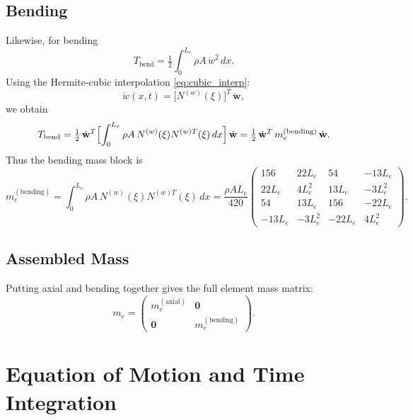 \documentclass{article}
\begin{document}
	\subsection{Bending}
	Likewise, for bending
	\begin{equation}
		T_{\mathrm{bend}}
		= \tfrac12\int_0^{L_e}\rho A\,\dot w^2\,dx.
	\end{equation}
	Using the Hermite‐cubic interpolation \eqref{eq:cubic_interp}:
	\begin{equation}
		\dot w(x,t)
		= \bigl[N^{(w)}(\xi)\bigr]^T\,\dot{\mathbf{w}},
	\end{equation}
	we obtain
	\begin{equation}
		T_{\mathrm{bend}}
		= \tfrac12\,\dot{\mathbf{w}}^T
		\Bigl[\int_0^{L_e}\rho A\,N^{(w)}(\xi)N^{(w)T}(\xi)\,dx\Bigr]
		\,\dot{\mathbf{w}}
		= \tfrac12\,\dot{\mathbf{w}}^T\,m_e^{(\mathrm{bending})}\,\dot{\mathbf{w}}.
	\end{equation}
	Thus the bending mass block is
	\begin{equation}\label{eq:me_bending}
		m_e^{(\mathrm{bending})}
		= \int_0^{L_e}\rho A\,N^{(w)}(\xi)N^{(w)T}(\xi)\,dx
		= \frac{\rho A L_e}{420}
		\begin{pmatrix}
			156 & 22L_e & 54 & -13L_e\\
			22L_e & 4L_e^2 & 13L_e & -3L_e^2\\
			54 & 13L_e & 156 & -22L_e\\
			-13L_e & -3L_e^2 & -22L_e & 4L_e^2
		\end{pmatrix}.
	\end{equation}
	
	\subsection{Assembled Mass}
	Putting axial and bending together gives the full element mass matrix:
	\begin{equation}\label{eq:me_assembled}
		m_e
		= \begin{pmatrix}
			m_e^{(\mathrm{axial})} & \mathbf{0}\\
			\mathbf{0}            & m_e^{(\mathrm{bending})}
		\end{pmatrix}.
	\end{equation}
	
	\section*{Equation of Motion and Time Integration}
	
\end{document}
